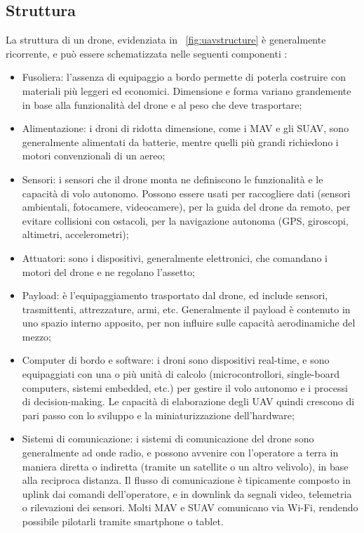 \subsection[Struttura]{Struttura}
La struttura di un drone, evidenziata in \figurename\ \ref{fig:uavstructure} è generalmente ricorrente, e può essere schematizzata nelle seguenti componenti \cite{sahingoz2014networking}:

\begin{itemize}
	\item Fusoliera: l'assenza di equipaggio a bordo permette di poterla costruire con materiali più leggeri ed economici. Dimensione e forma variano grandemente in base alla funzionalità del drone e al peso che deve trasportare;
	\item Alimentazione: i droni di ridotta dimensione, come i MAV e gli SUAV, sono generalmente alimentati da batterie, mentre quelli più grandi richiedono i motori convenzionali di un aereo;
	\item Sensori: i sensori che il drone monta ne definiscono le funzionalità e le capacità di volo autonomo. Possono essere usati per raccogliere dati (sensori ambientali, fotocamere, videocamere), per la guida del drone da remoto, per evitare collisioni con ostacoli, per la navigazione autonoma (GPS, giroscopi, altimetri, accelerometri);
	\item Attuatori: sono i dispositivi, generalmente elettronici, che comandano i motori del drone e ne regolano l'assetto;
	\item Payload: è l'equipaggiamento trasportato dal drone, ed include sensori, trasmittenti, attrezzature, armi, etc. Generalmente il payload è contenuto in uno spazio interno apposito, per non influire sulle capacità aerodinamiche del mezzo;
	\item Computer di bordo e software: i droni sono dispositivi real-time, e sono equipaggiati con una o più unità di calcolo (microcontrollori, single-board computers, sistemi embedded, etc.)  per gestire il volo autonomo e i processi di decision-making. Le capacità di elaborazione degli UAV quindi crescono di pari passo con lo sviluppo e la miniaturizzazione dell'hardware;
	\item Sistemi di comunicazione: i sistemi di comunicazione del drone sono generalmente ad onde radio, e possono avvenire con l'operatore a terra in maniera diretta o indiretta (tramite un satellite o un altro velivolo), in base alla reciproca distanza. Il flusso di comunicazione è tipicamente composto in uplink dai comandi dell'operatore, e in downlink da segnali video, telemetria o rilevazioni dei sensori. Molti  MAV e SUAV comunicano via Wi-Fi, rendendo possibile pilotarli tramite smartphone o tablet.  
\end{itemize}

